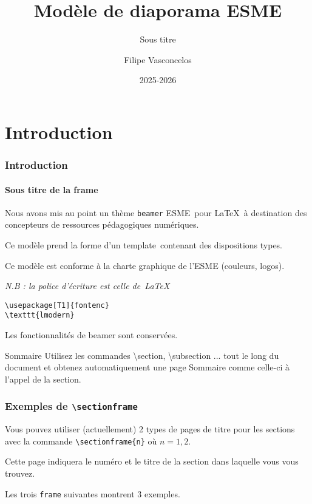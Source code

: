 \documentclass[t,aspectratio=169]{beamer}
\title{Modèle de diaporama ESME}
\subtitle{Sous titre}
\author{Filipe Vasconcelos\inst{1}}
\institute{
    \inst{1} ESME Sudria, Lille, \textcolor{blue}{\texttt{filipe.vasconcelo@esme.fr}}
}
\date{2025-2026}
\begin{document}

\section{Introduction}
\begin{frame}[fragile] 
\frametitle{Introduction} 
\framesubtitle{Sous titre de la frame} 

Nous avons mis au point un thème \texttt{beamer} \og ESME\fg~pour 
\LaTeX~à destination des concepteurs de ressources pédagogiques 
numériques.\newline

Ce modèle prend la forme d'un \og template\fg~contenant des 
dispositions types.\newline

Ce modèle est conforme à la charte graphique de l'ESME (couleurs, 
logos).

\emph{N.B : la police d'écriture est celle de~\LaTeX}\newline

\begin{verbatim}
\usepackage[T1]{fontenc}
\texttt{lmodern}
\end{verbatim}

Les fonctionnalités de beamer sont conservées.
\end{frame}

\begin{frame}{Sommaire}
    \tableofcontents
    \scriptsize
    Utilisez les commandes \textbackslash section, \textbackslash subsection ...
    tout le long du document et obtenez automatiquement une page Sommaire 
    comme celle-ci à l'appel de la section. 
\end{frame}

\begin{frame} 
    \frametitle{Exemples de \texttt{\textbackslash sectionframe}}

    Vous pouvez utiliser (actuellement) 2 types de pages de titre pour
    les sections avec la commande \texttt{\textbackslash sectionframe\{n\}} 
    où $n=1,2$.\newline

    Cette page indiquera le numéro et le titre de la section dans laquelle
    vous vous trouvez.\newline

    Les trois \texttt{frame} suivantes montrent 3 exemples.
\end{frame}
\end{document}
